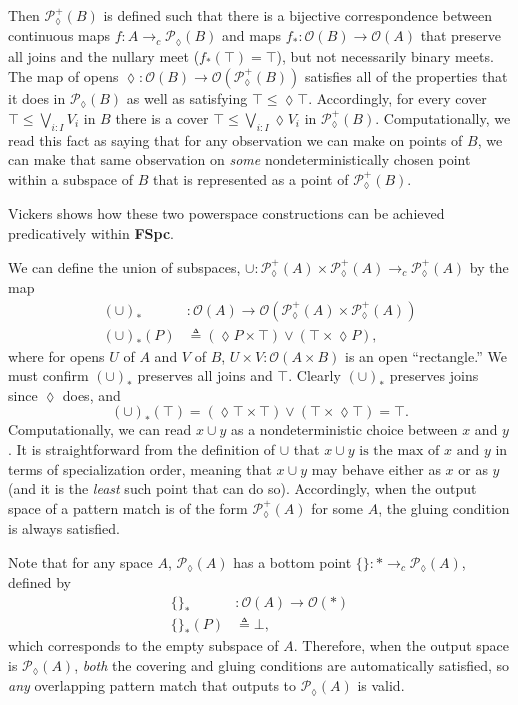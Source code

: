 \documentclass[conference]{IEEEtran}
\newcommand{\PLower}{\mathcal{P}_\lozenge}
\newcommand{\cto}{\to_c}
\newcommand{\One}{\ast}
\newcommand{\Open}[1]{\mathcal{O}({#1})}
\newcommand{\isthemaxof}[3]{{#1}\text{ is the max of }{#2}\text{ and }{#3}}
\begin{document}
Then $\PLower^+(B)$ is defined such that there is a bijective correspondence between continuous maps $f : A \cto \PLower(B)$ and maps $f_* : \Open{B} \to \Open{A}$ that preserve all joins and the nullary meet ($f_*(\top) = \top$), but not necessarily binary meets. The map of opens $\lozenge : \Open{B} \to \Open{\PLower^+(B)}$ satisfies all of the properties that it does in $\PLower(B)$ as well as satisfying
$\top \le \lozenge \top$. Accordingly, for every cover $\top \le \bigvee_{i : I} V_i$ in $B$ there is a cover $\top \le \bigvee_{i : I} \lozenge V_i$ in $\PLower^+(B)$. Computationally, we read this fact as saying that for any observation we can make on points of $B$, we can make that same observation on \emph{some} nondeterministically chosen point within a subspace of $B$ that is represented as a point of $\PLower^+(B)$.

Vickers \cite{vickersdoublepowerlocale} shows how these two powerspace constructions can be achieved predicatively within \textbf{FSpc}. 

We can define the union of subspaces, $
\cup : \PLower^+(A) \times \PLower^+(A) \cto \PLower^+(A)$ by the map
\begin{align*}
(\cup)_* &: \Open{A} \to \Open{\PLower^+(A) \times \PLower^+(A)}
\\ (\cup)_*(P) &\triangleq (\lozenge P \times \top) \vee (\top \times \lozenge P),
\end{align*}
where for opens $U$ of $A$ and $V$ of $B$, $U \times V : \Open{A \times B}$ is an open ``rectangle.''
We must confirm $(\cup)_*$ preserves all joins and $\top$. Clearly $(\cup)_*$ preserves joins since $\lozenge$ does, and
\[
(\cup)_*(\top) = (\lozenge \top \times \top) \vee (\top \times \lozenge \top) = \top.
\]
Computationally, we can read $x \cup y$ as a nondeterministic choice between $x$ and $y$.
It is straightforward from the definition of $\cup$ that $\isthemaxof{x \cup y}{x}{y}$ in terms of specialization order, meaning that $x \cup y$ may behave either as $x$ or as $y$ (and it is the \emph{least} such point that can do so). Accordingly, when the output space of a pattern match is of the form $\PLower^+(A)$ for some $A$, the gluing condition is always satisfied.

Note that for any space $A$, $\PLower(A)$ has a bottom point $\{ \} : \One \cto \PLower(A)$, defined by
\begin{align*}
\{\}_* &: \Open{A} \to \Open{\One}
\\ \{ \}_*(P) &\triangleq \bot,
\end{align*}
which corresponds to the empty subspace of $A$. Therefore, when the output space is $\PLower(A)$, \emph{both} the covering and gluing conditions are automatically satisfied, so \emph{any} overlapping pattern match that outputs to $\PLower(A)$ is valid.
\end{document}
